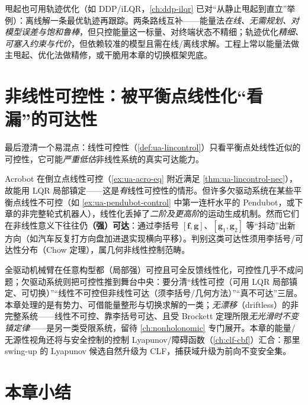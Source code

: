 \begin{note}
甩起也可用轨迹优化（如 DDP/iLQR，\cref{ch:ddp-ilqr} 已对“从静止甩起到直立”举例）：离线解一条最优轨迹再跟踪。两条路线互补——能量法\emph{在线、无需规划、对模型误差与饱和鲁棒}，但只控能量这一标量、对终端状态不精细；轨迹优化\emph{精细、可塞入约束与代价}，但依赖较准的模型且需在线/离线求解。工程上常以能量法做主甩起、优化法做精修，或干脆用本章的切换框架兜底。
\end{note}

\section{非线性可控性：被平衡点线性化“看漏”的可达性}\label{sec:ua-nonlinear-control}

最后澄清一个易混点：线性可控性（\cref{def:ua-lincontrol}）只看平衡点处线性近似的可控性，它可能\emph{严重低估}非线性系统的真实可达能力。

\begin{insight}
Acrobot 在倒立点线性可控（\cref{ex:ua-acro-eq} 附近满足 \cref{thm:ua-lincontrol-nec}），故能用 LQR 局部镇定——这是\emph{有}线性可控性的情形。但许多欠驱动系统在某些平衡点线性不可控（如 \cref{ex:ua-pendubot-control} 中第一连杆水平的 Pendubot，或下章的非完整轮式机器人），线性化丢掉了\emph{二阶及更高阶}的运动生成机制。然而它们在非线性意义下往往仍\textbf{（强）可达}：通过李括号 $[\mathbf{f},\mathbf{g}]$、$[\mathbf{g}_1,\mathbf{g}_2]$ 等“抖动”出新方向（如汽车反复打方向盘加进退实现横向平移）。判别这类可达性须用李括号/可达性分布（Chow 定理），属几何非线性控制范畴。
\end{insight}

\begin{note}
全驱动机械臂在任意构型都（局部强）可控且可全反馈线性化，可控性几乎不成问题；欠驱动系统则把可控性推到舞台中央：要分清“线性可控（可用 LQR 局部镇定、可切换）”“线性不可控但非线性可达（须李括号/几何方法）”“真不可达”三层。本章处理的是有势力、可借能量整形与切换求解的一类；\emph{无漂移}（driftless）的非完整系统——线性不可控、靠李括号可达、且受 Brockett 定理所限\emph{无光滑时不变镇定律}——是另一类受限系统，留待 \cref{ch:nonholonomic} 专门展开。本章的能量/无源性视角还将与安全控制的控制 Lyapunov/障碍函数（\cref{ch:clf-cbf}）汇合：那里 swing-up 的 Lyapunov 候选自然升级为 CLF，捕获域升级为前向不变安全集。
\end{note}

\section{本章小结}\label{sec:ua-summary}

